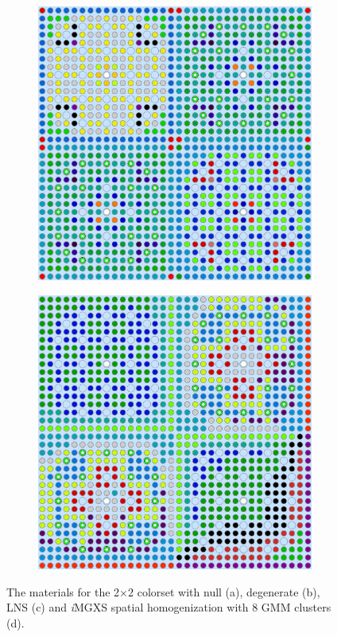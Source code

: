 \documentclass[12pt,twoside]{mitthesis-exec}
\begin{document}
\begin{figure}[h!]
\begin{subfigure}{0.47\textwidth}
  \caption{}
  \label{fig:reflector-degenerate}
\end{subfigure}
\begin{subfigure}{0.47\textwidth}
  \centering
  \includegraphics[width=0.95\linewidth]{figures/patterns/lns/reflector/materials}
  \caption{}
  \label{fig:reflector-lns}
\end{subfigure}%
\begin{subfigure}{0.47\textwidth}
  \centering
  \includegraphics[width=0.95\linewidth]{figures/unsupervised/geometries/with-features/8-clusters/combined/reflector}
  \caption{}
  \label{fig:reflector-8-clusters}
\end{subfigure}
\caption[Materials for the 2$\times$2 colorset]{The materials for the 2$\times$2 colorset with null (a), degenerate (b), LNS (c) and \textit{i}MGXS spatial homogenization with 8 GMM clusters (d).}
\label{fig:colorset-geometries}
\end{figure}
\end{document}
